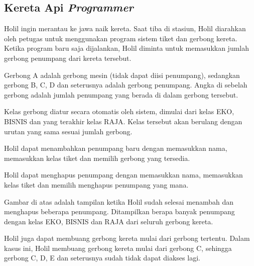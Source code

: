 \documentclass[../main.tex]{subfiles}
\begin{document}
    \subsection{Kereta Api \textit{Programmer}}

    Holil ingin merantau ke jawa naik kereta. Saat tiba di stasiun, Holil diarahkan oleh petugas untuk menggunakan program sistem tiket dan gerbong kereta. Ketika program baru saja dijalankan, Holil diminta untuk memasukkan jumlah gerbong penumpang dari kereta tersebut.


    Gerbong A adalah gerbong mesin (tidak dapat diisi penumpang), sedangkan gerbong B, C, D dan seterusnya adalah gerbong penumpang. Angka di sebelah gerbong adalah jumlah penumpang yang berada di dalam gerbong tersebut.


    Kelas gerbong diatur secara otomatis oleh sistem, dimulai dari kelas EKO, BISNIS dan yang terakhir kelas RAJA. Kelas tersebut akan berulang dengan urutan yang sama sesuai jumlah gerbong.
    

    Holil dapat menambahkan penumpang baru dengan memasukkan nama, memasukkan kelas tiket dan memilih gerbong yang tersedia.


    Holil dapat menghapus penumpang dengan memasukkan nama, memasukkan kelas tiket dan memilih menghapus penumpang yang mana.


    Gambar di atas adalah tampilan ketika Holil sudah selesai menambah dan menghapus beberapa penumpang. Ditampilkan berapa banyak penumpang dengan kelas EKO, BISNIS dan RAJA dari seluruh gerbong kereta.


    Holil juga dapat membuang gerbong kereta mulai dari gerbong tertentu. Dalam kasus ini, Holil membuang gerbong kereta mulai dari gerbong C, sehingga gerbong C, D, E dan seterusnya sudah tidak dapat diakses lagi.
\end{document}
